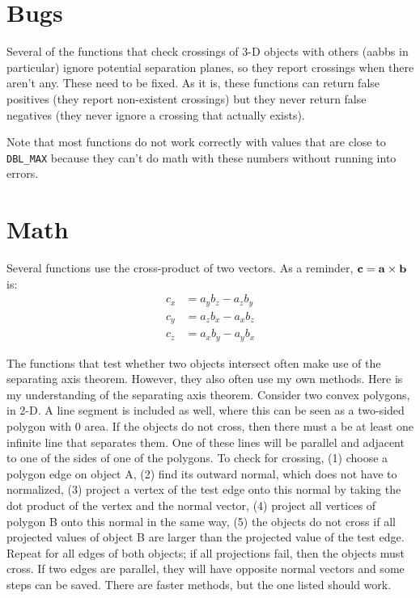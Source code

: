 \documentclass[11pt]{article}
\newcommand {\ttt} {\texttt}
\begin{document}
\section{Bugs}

Several of the functions that check crossings of 3-D objects with others (aabbs in particular) ignore potential separation planes, so they report crossings when there aren't any.  These need to be fixed.  As it is, these functions can return false positives (they report non-existent crossings) but they never return false negatives (they never ignore a crossing that actually exists).

Note that most functions do not work correctly with values that are close to \ttt{DBL\_MAX} because they can't do math with these numbers without running into errors.

\section{Math}

Several functions use the cross-product of two vectors.  As a reminder, $\vb{c}=\vb{a} \times \vb{b}$ is:
\begin{align*}
c_x &= a_y b_z - a_z b_y\\
c_y &= a_z b_x - a_x b_z\\
c_z &= a_x b_y - a_y b_x
\end{align*}

The functions that test whether two objects intersect often make use of the separating axis theorem.  However, they also often use my own methods.  Here is my understanding of the separating axis theorem.  Consider two convex polygons, in 2-D.  A line segment is included as well, where this can be seen as a two-sided polygon with 0 area.  If the objects do not cross, then there must a be at least one infinite line that separates them.  One of these lines will be parallel and adjacent to one of the sides of one of the polygons.  To check for crossing, (1) choose a polygon edge on object A, (2) find its outward normal, which does not have to normalized, (3) project a vertex of the test edge onto this normal by taking the dot product of the vertex and the normal vector, (4) project all vertices of polygon B onto this normal in the same way, (5) the objects do not cross if all projected values of object B are larger than the projected value of the test edge.  Repeat for all edges of both objects; if all projections fail, then the objects must cross.  If two edges are parallel, they will have opposite normal vectors and some steps can be saved.  There are faster methods, but the one listed should work.
\end{document}
